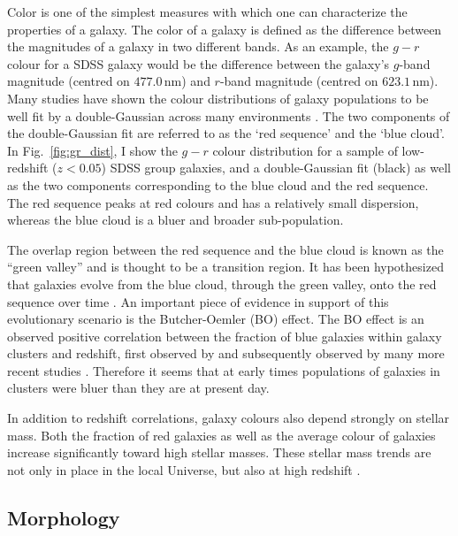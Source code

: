 Color is one of the simplest measures with which one can characterize
the properties of a galaxy.  The color of a galaxy is defined as the
difference between the magnitudes of a galaxy in two different bands.
As an example, the $g - r$ colour for a SDSS galaxy would be the
difference between the galaxy's $g$-band magnitude (centred on
$477.0\,\mathrm{nm}$) and $r$-band magnitude (centred on
$623.1\,\mathrm{nm}$).  Many studies have shown the colour
distributions of galaxy populations to be well fit by a
double-Gaussian across many environments \citep{balogh2004,
  baldry2006}.  The two
components of the double-Gaussian fit are referred to as the `red
sequence' and the `blue cloud'.  In Fig.~\ref{fig:gr_dist}, I show the
$g-r$ colour distribution for a sample of low-redshift ($z < 0.05$)
SDSS group galaxies, and a double-Gaussian fit (black) as well as the
two components corresponding to the blue cloud and the red sequence.
The red sequence peaks at red colours and has a
relatively small dispersion, whereas the blue cloud is a bluer and
broader sub-population.
\par
The overlap region between the red sequence
and the blue cloud is known as the ``green valley'' and is thought to
be a transition region.  It has been hypothesized that galaxies evolve
from the blue cloud, through the green valley, onto the red sequence
over time \citep[e.g.][]{trayford2016}.  An important piece of evidence in
support of
this evolutionary scenario is the Butcher-Oemler (BO) effect.  The BO
effect is an observed positive correlation between the fraction of blue
galaxies within galaxy clusters and redshift, first observed by
\citet{butcher1978} and subsequently observed by many more recent
studies \citep[e.g.][]{butcher1984, ellingson2001, loh2008,
  urquhart2010}.  Therefore it seems that at early times populations
of galaxies in clusters were bluer than they are at present day.
\par
In addition to redshift correlations, galaxy colours also depend
strongly on stellar mass.  Both the fraction of red galaxies \citep{baldry2006,
  bamford2009, kimm2009, prescott2011} as well as the average colour
of galaxies \citep{cooper2008, vandenbosch2008a} increase significantly toward
high stellar masses.  These stellar mass trends are not only in place
in the local Universe, but also at high redshift \citep{grutzbauch2011}.

\subsection{Morphology}
\label{sec:morph}

